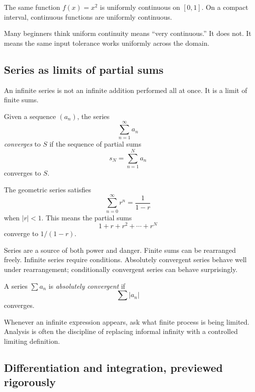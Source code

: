\begin{example}
The same function $f(x)=x^2$ is uniformly continuous on $[0,1]$. On a compact
interval, continuous functions are uniformly continuous.
\end{example}

\begin{trapbox}
Many beginners think uniform continuity means ``very continuous.'' It does not.
It means the same input tolerance works uniformly across the domain.
\end{trapbox}

\subsection{Series as limits of partial sums}

An infinite series is not an infinite addition performed all at once. It is a
limit of finite sums.

\begin{definition}
Given a sequence $(a_n)$, the series
\[
\sum_{n=1}^{\infty}a_n
\]
\emph{converges} to $S$ if the sequence of partial sums
\[
s_N=\sum_{n=1}^N a_n
\]
converges to $S$.
\end{definition}

\begin{example}
The geometric series satisfies
\[
\sum_{n=0}^{\infty}r^n=\frac{1}{1-r}
\]
when $|r|<1$. This means the partial sums
\[
1+r+r^2+\cdots+r^N
\]
converge to $1/(1-r)$.
\end{example}

Series are a source of both power and danger. Finite sums can be rearranged
freely. Infinite series require conditions. Absolutely convergent series behave
well under rearrangement; conditionally convergent series can behave
surprisingly.

\begin{definition}
A series $\sum a_n$ is \emph{absolutely convergent} if
\[
\sum |a_n|
\]
converges.
\end{definition}

\begin{focusbox}
Whenever an infinite expression appears, ask what finite process is being
limited. Analysis is often the discipline of replacing informal infinity with a
controlled limiting definition.
\end{focusbox}

\subsection{Differentiation and integration, previewed rigorously}


